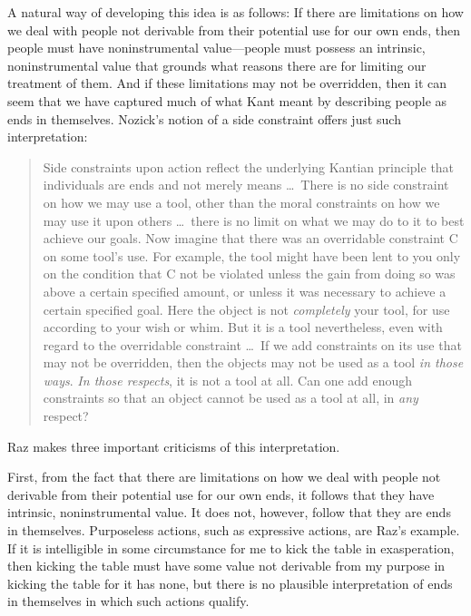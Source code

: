 \documentclass[a4paper,12pt]{article}
\begin{document}
A natural way of developing this idea is as follows: If there are limitations on how we deal with people not derivable from their potential use for our own ends, then people must have noninstrumental value---people must possess an intrinsic, noninstrumental value that grounds what reasons there are for limiting our treatment of them. And if these limitations may not be overridden, then it can seem that we have captured much of what Kant meant by describing people as ends in themselves. Nozick's notion of a side constraint offers just such interpretation:
\begin{quote}
    Side constraints upon action reflect the underlying Kantian principle that individuals are ends and not merely means \ldots\ There is no side constraint on how we may use a tool, other than the moral constraints on how we may use it upon others \ldots\ there is no limit on what we may do to it to best achieve our goals. Now imagine that there was an overridable constraint C on some tool's use. For example, the tool might have been lent to you only on the condition that C not be violated unless the gain from doing so was above a certain specified amount, or unless it was necessary to achieve a certain specified goal. Here the object is not \emph{completely} your tool, for use according to your wish or whim. But it is a tool nevertheless, even with regard to the overridable constraint \ldots\ If we add constraints on its use that may not be overridden, then the objects may not be used as a tool \emph{in those ways}. \emph{In those respects}, it is not a tool at all. Can one add enough constraints so that an object cannot be used as a tool at all, in \emph{any} respect? \citep[30--1]{Nozick:1974as}
\end{quote}

Raz makes three important criticisms of this interpretation.

First, from the fact that there are limitations on how we deal with people not derivable from their potential use for our own ends, it follows that they have intrinsic, noninstrumental value. It does not, however, follow that they are ends in themselves. Purposeless actions, such as expressive actions, are Raz's example. If it is intelligible in some circumstance for me to kick the table in exasperation, then kicking the table must have some value not derivable from my purpose in kicking the table for it has none, but there is no plausible interpretation of ends in themselves in which such actions qualify.
\end{document}
